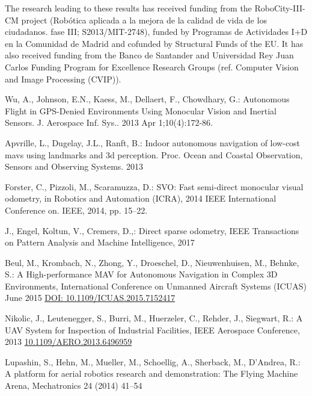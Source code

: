 \documentclass{styles/svproc}
\begin{document}
        The research leading to these results has received funding from the RoboCity\--III\--CM project (Rob\'otica aplicada a la mejora de la calidad de vida de los ciudadanos. fase III; S2013/MIT-2748), funded by Programas de Actividades I+D en la Comunidad de Madrid and cofunded by Structural Funds of the EU. It has also received funding from
the Banco de Santander and Universidad Rey Juan Carlos Funding Program for Excellence Research Groups (ref. Computer Vision and Image Processing (CVIP)).

%
%
\begin{thebibliography}{6}
  Wu, A., Johnson, E.N., Kaess, M., Dellaert, F., Chowdhary, G.: 
  Autonomous Flight in GPS-Denied Environments Using Monocular Vision and Inertial Sensors. 
  J. Aerospace Inf. Sys.. 2013 Apr 1;10(4):172-86.

  Apvrille, L., Dugelay, J.L., Ranft, B.: 
  Indoor autonomous navigation of low-cost mavs using landmarks and 3d perception. 
  Proc. Ocean and Coastal Observation, Sensors and Observing Systems. 2013 

  Forster, C., Pizzoli, M., Scaramuzza, D.: 
  SVO: Fast semi-direct monocular visual odometry, 
  in Robotics and Automation (ICRA), 2014 IEEE International Conference on. IEEE, 2014, pp. 15–22.

  J., Engel, Koltun, V., Cremers, D.,: 
  Direct sparse odometry, 
  IEEE Transactions on Pattern Analysis and Machine Intelligence, 2017

  Beul, M., Krombach, N., Zhong, Y., Droeschel, D., Nieuwenhuisen, M., Behnke, S.: 
  A High-performance MAV for Autonomous Navigation in Complex 3D Environments,
  International Conference on Unmanned Aircraft Systems (ICUAS) June 2015 \url{DOI: 10.1109/ICUAS.2015.7152417}

  Nikolic, J., Leutenegger, S., Burri, M., Huerzeler, C., Rehder, J., Siegwart, R.: 
  A UAV System for Inspection of Industrial Facilities, 
  IEEE Aerospace Conference, 2013 \url{10.1109/AERO.2013.6496959}

  Lupashin, S., Hehn, M., Mueller, M., Schoellig, A., Sherback, M., D’Andrea, R.: 
  A platform for aerial robotics research and demonstration: The Flying Machine Arena, 
  Mechatronics 24 (2014) 41–54


\end{thebibliography}
\end{document}

